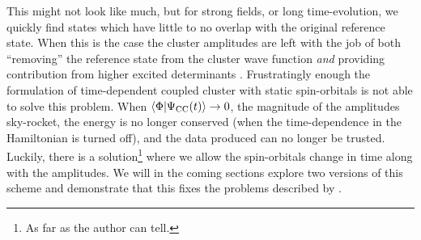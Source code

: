             This might not look like much, but for strong fields, or long
            time-evolution, we quickly find states which have little to no
            overlap with the original reference state.
            When this is the case the cluster amplitudes are left with the job
            of both ``removing'' the reference state from the cluster wave
            function \emph{and} providing contribution from higher excited
            determinants \cite{pedersen2018symplectic}.
            Frustratingly enough the formulation of time-dependent coupled
            cluster with static spin-orbitals is not able to solve this problem.
            When $\langle \Phi | \Psi_{\text{CC}}(t) \rangle \to 0$, the magnitude of the amplitudes
            sky-rocket, the energy is no longer conserved (when the
            time-dependence in the Hamiltonian is turned off), and the data
            produced can no longer be trusted.
            Luckily, there is a solution\footnote{
                As far as the author can tell.
            } where we allow the spin-orbitals change in time along with the
            amplitudes.
            We will in the coming sections explore two versions of this scheme
            and demonstrate that this fixes the problems described by
            \citeauthor{pedersen2018symplectic} \cite{pedersen2018symplectic}.

